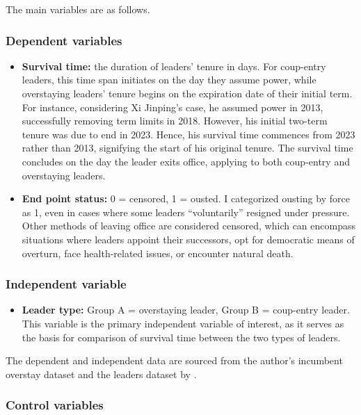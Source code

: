\documentclass[
  12pt,
  a4paper,
  12pt]{article}
\providecommand{\tightlist}{%
  \setlength{\itemsep}{0pt}\setlength{\parskip}{0pt}}\usepackage{longtable,booktabs,array}
\begin{document}
The main variables are as follows.

\subsubsection{Dependent variables}\label{dependent-variables}

\begin{itemize}
\item
  \textbf{Survival time:} the duration of leaders' tenure in days. For
  coup-entry leaders, this time span initiates on the day they assume
  power, while overstaying leaders' tenure begins on the expiration date
  of their initial term. For instance, considering Xi Jinping's case, he
  assumed power in 2013, successfully removing term limits in 2018.
  However, his initial two-term tenure was due to end in 2023. Hence,
  his survival time commences from 2023 rather than 2013, signifying the
  start of his original tenure. The survival time concludes on the day
  the leader exits office, applying to both coup-entry and overstaying
  leaders.
\item
  \textbf{End point status:} 0 = censored, 1 = ousted. I categorized
  ousting by force as 1, even in cases where some leaders
  ``voluntarily'' resigned under pressure. Other methods of leaving
  office are considered censored, which can encompass situations where
  leaders appoint their successors, opt for democratic means of
  overturn, face health-related issues, or encounter natural death.
\end{itemize}

\subsubsection{Independent variable}\label{independent-variable}

\begin{itemize}
\tightlist
\item
  \textbf{Leader type:} Group A = overstaying leader, Group B =
  coup-entry leader. This variable is the primary independent variable
  of interest, as it serves as the basis for comparison of survival time
  between the two types of leaders.
\end{itemize}

The dependent and independent data are sourced from the author's
incumbent overstay dataset and the leaders dataset by
\citep{goemans2009}.

\subsubsection{Control variables}\label{control-variables}
\end{document}
